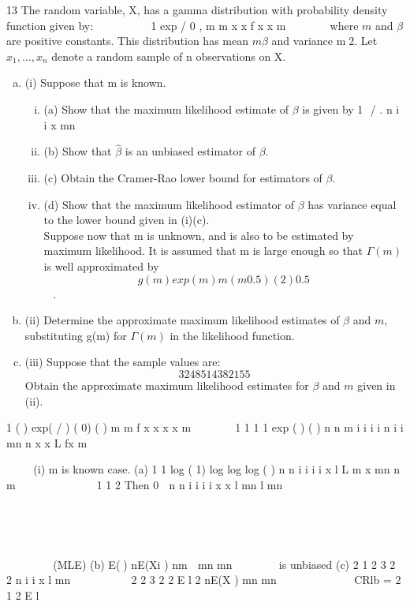 \documentclass[a4paper,12pt]{article}
\begin{document}
13 The random variable, X, has a gamma distribution with probability density function
given by:
 
 
 
 
1 exp /
0 ,
m
m
x x
f x x
m
  
 \beta
 
where $m$ and $\beta$ are positive constants. This distribution has mean $m\beta$ and variance
m2. Let $x_1, \ldots , x_n$ denote a random sample of n observations on X.
\begin{enumerate}[(a)]
    \item (i) Suppose that m is known.
    \begin{enumerate}[(i)]
 \item (a) Show that the maximum likelihood estimate of $\beta$ is given by
1
 / . n
i i x mn

 
 \item  (b) Show that $\hat{\beta}$ is an unbiased estimator of $\beta$.
 \item  (c) Obtain the Cramer-Rao lower bound for estimators of $\beta$.
 \item (d) Show that the maximum likelihood estimator of $\beta$ has variance equal to the lower bound given in (i)(c). 
 \\ \medskip
Suppose now that m is unknown, and is also to be estimated by maximum likelihood. It is assumed that m is large enough so that $\Gamma(m)$ is well approximated by
\[g(m) exp( m)m(m 0.5) (2 )0.5 \]
   .
\end{enumerate}
    \item (ii) Determine the approximate maximum likelihood estimates of $\beta$ and $m$, substituting g(m) for $\Gamma(m)$ in the likelihood function. 
    \item (iii) Suppose that the sample values are:
\[32 48 51 43 82 155\]
Obtain the approximate maximum likelihood estimates for $\beta$ and $m$ given in (ii). 
\end{enumerate}


1 ( ) exp( / ) ( 0)
( )
m
m
f x x x x
m
  
 \beta
 
1 1
1
1
exp
( )
( )
n n m i i
i i n
i i mn n
x x
L fx
m
 


 \beta 
 \Gamma
  	 
 

 


(i) m is known case.
(a) 1
1
log ( 1) log log log ( )
n
n i
i
i
i
x
l L m x mn n m 

      \beta



1 1
2
Then 0 
n n
i i
i i
x x
l mn l
mn
   

  
 


   
 
(MLE)
(b) E() nE(Xi ) nm 
mn mn

    is unbiased
(c)
2
1
2 3 2 2
n
i
i
x
l mn  
  \beta
  

2
2 3 2 2
E l 2 nE(X ) mn mn
  
  \beta  \Gamma \beta  
 	  	 	 	
 CRlb =
2 1
2
E l
    \beta
\Gamma 		 
\end{document}
